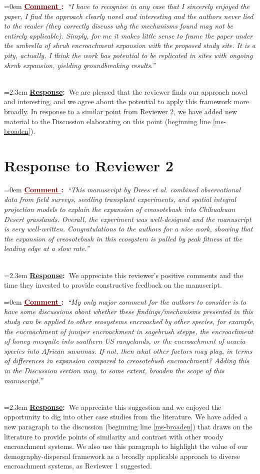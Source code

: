 \documentclass[12pt]{article}
\newcounter{cN}
\newcommand{\comment}[1]{
	\vspace{2em}
	\refstepcounter{cN} %
	\noindent \hangindent=0em \textbf{\textcolor{Maroon}{\uline{Comment \thecN}:~}}\emph{``#1''}
	}
\newcommand{\response}[1]{
	\\[0.25em]
	\hangindent=2.3em \textbf{\textcolor{NavyBlue}{\uline{Response}:~}}#1
	}
\begin{document}
\comment{I have to recognise in any case that I sincerely enjoyed the paper, I find the approach clearly novel and interesting and the authors never lied to the reader (they correctly discuss why the mechanisms found may not be entirely applicable). Simply, for me it makes little sense to frame the paper under the umbrella of shrub encroachment expansion with the proposed study site. It is a pity, actually. I think the work has potential to be replicated in sites with ongoing shrub expansion, yielding groundbreaking results.}
\response{We are pleased that the reviewer finds our approach novel and interesting, and we agree about the potential to apply this framework more broadly. In response to a similar point from Reviewer 2, we have added new material to the Discussion elaborating on this point (beginning line \ref{ms-broaden}).}

\section{Response to Reviewer 2}
\vspace{-2em}

\comment{This manuscript by Drees et al. combined observational data from field surveys, seedling transplant experiments, and spatial integral projection models to explain the expansion of creosotebush into Chihuahuan Desert grasslands. Overall, the experiment was well-designed and the manuscript is very well-written. Congratulations to the authors for a nice work, showing that the expansion of creosotebush in this ecosystem is pulled by peak fitness at the leading edge at a slow rate.}
\response{We appreciate this reviewer's positive comments and the time they invested to provide constructive feedback on the manuscript.}
	
\comment{My only major comment for the authors to consider is to have some discussions about whether these findings/mechanisms presented in this study can be applied to other ecosystems encroached by other species, for example, the encroachment of juniper encroachment in sagebrush steppe, the encroachment of honey mesquite into southern US rangelands, or the encroachment of acacia species into African savannas. If not, then what other factors may play, in terms of differences in expansion compared to creosotebush encroachment? Adding this in the Discussion section may, to some extent, broaden the scope of this manuscript.}
\response{We appreciate this suggestion and we enjoyed the opportunity to dig into other case studies from the literature. We have added a new paragraph to the discussion (beginning line \ref{ms-broaden}) that draws on the literature to provide points of similarity and contrast with other woody encroachment systems. We also use this paragraph to highlight the value of our demography-dispersal framework as a broadly applicable approach to diverse encroachment systems, as Reviewer 1 suggested.}
\end{document}
